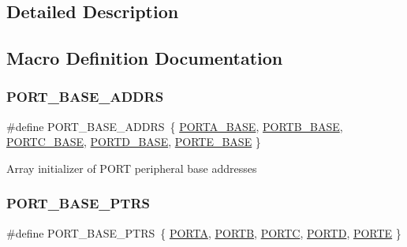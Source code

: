 \subsection{Detailed Description}


\subsection{Macro Definition Documentation}
\mbox{\label{group___p_o_r_t___register___masks_ga80b01d00368494b63dd2a67eda52b241}} 
\subsubsection{\texorpdfstring{P\+O\+R\+T\+\_\+\+B\+A\+S\+E\+\_\+\+A\+D\+D\+RS}{PORT\_BASE\_ADDRS}}
{\footnotesize\ttfamily \#define P\+O\+R\+T\+\_\+\+B\+A\+S\+E\+\_\+\+A\+D\+D\+RS~\{ \mbox{\hyperlink{group___p_o_r_t___register___masks_gae3d20f730f9619aabbf94e2efd1de34c}{P\+O\+R\+T\+A\+\_\+\+B\+A\+SE}}, \mbox{\hyperlink{group___p_o_r_t___register___masks_ga2a668049a5e6c09cf6a7164ffca38a7e}{P\+O\+R\+T\+B\+\_\+\+B\+A\+SE}}, \mbox{\hyperlink{group___p_o_r_t___register___masks_ga0018f0edf7f8030868f9cc791275378d}{P\+O\+R\+T\+C\+\_\+\+B\+A\+SE}}, \mbox{\hyperlink{group___p_o_r_t___register___masks_gab88c980d0129f396683260eb978daf15}{P\+O\+R\+T\+D\+\_\+\+B\+A\+SE}}, \mbox{\hyperlink{group___p_o_r_t___register___masks_ga72d490d67d751071845b3532193b4b93}{P\+O\+R\+T\+E\+\_\+\+B\+A\+SE}} \}}

Array initializer of P\+O\+RT peripheral base addresses \mbox{\label{group___p_o_r_t___register___masks_ga54ff5179f8acaef2e1683cedfc0ef453}} 
\subsubsection{\texorpdfstring{P\+O\+R\+T\+\_\+\+B\+A\+S\+E\+\_\+\+P\+T\+RS}{PORT\_BASE\_PTRS}}
{\footnotesize\ttfamily \#define P\+O\+R\+T\+\_\+\+B\+A\+S\+E\+\_\+\+P\+T\+RS~\{ \mbox{\hyperlink{group___p_o_r_t___register___masks_ga7c8a7f98a98d8cb125dd57a66720ab30}{P\+O\+R\+TA}}, \mbox{\hyperlink{group___p_o_r_t___register___masks_ga09a0c85cd3da09d9cdf63a5ac4c39f77}{P\+O\+R\+TB}}, \mbox{\hyperlink{group___p_o_r_t___register___masks_ga68fea88642279a70246e026e7221b0a5}{P\+O\+R\+TC}}, \mbox{\hyperlink{group___p_o_r_t___register___masks_ga3e6a2517db4f9cb7c9037adf0aefe79b}{P\+O\+R\+TD}}, \mbox{\hyperlink{group___p_o_r_t___register___masks_ga7e2386d3b1084b5b875ae3696f550ba9}{P\+O\+R\+TE}} \}}

